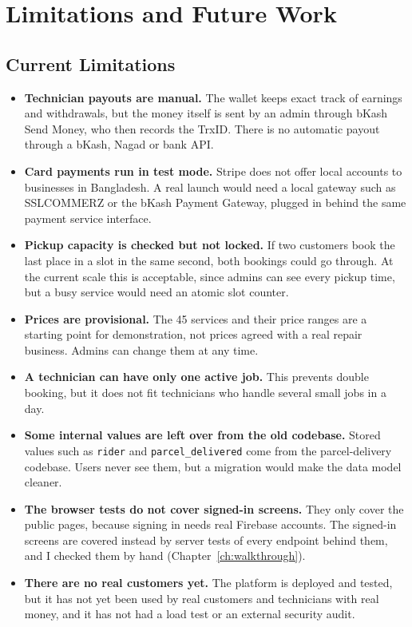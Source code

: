 \documentclass{standalone}
\begin{document}
\chapter{Limitations and Future Work}
\label{ch:limitations}

\section{Current Limitations}
\begin{itemize}
  \item \textbf{Technician payouts are manual.} The wallet keeps exact track of earnings and withdrawals, but the money itself is sent by an admin through bKash Send Money, who then records the TrxID. There is no automatic payout through a bKash, Nagad or bank API.
  \item \textbf{Card payments run in test mode.} Stripe does not offer local accounts to businesses in Bangladesh. A real launch would need a local gateway such as SSLCOMMERZ or the bKash Payment Gateway, plugged in behind the same payment service interface.
  \item \textbf{Pickup capacity is checked but not locked.} If two customers book the last place in a slot in the same second, both bookings could go through. At the current scale this is acceptable, since admins can see every pickup time, but a busy service would need an atomic slot counter.
  \item \textbf{Prices are provisional.} The 45 services and their price ranges are a starting point for demonstration, not prices agreed with a real repair business. Admins can change them at any time.
  \item \textbf{A technician can have only one active job.} This prevents double booking, but it does not fit technicians who handle several small jobs in a day.
  \item \textbf{Some internal values are left over from the old codebase.} Stored values such as \texttt{rider} and \texttt{parcel\_delivered} come from the parcel-delivery codebase. Users never see them, but a migration would make the data model cleaner.
  \item \textbf{The browser tests do not cover signed-in screens.} They only cover the public pages, because signing in needs real Firebase accounts. The signed-in screens are covered instead by server tests of every endpoint behind them, and I checked them by hand (Chapter~\ref{ch:walkthrough}).
  \item \textbf{There are no real customers yet.} The platform is deployed and tested, but it has not yet been used by real customers and technicians with real money, and it has not had a load test or an external security audit.
\end{itemize}
\end{document}
